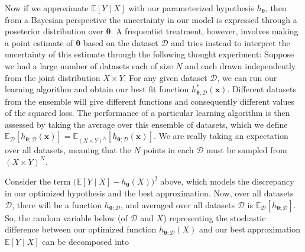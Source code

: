 \documentclass{article}
\begin{document}
      Now if we approximate $\mathbb{E}[Y \mid X]$ with our parameterized hypothesis $h_{\boldsymbol{\theta}}$, then from a Bayesian perspective the uncertainty in our model is expressed through a poseterior distribution over ${\boldsymbol{\theta}}$. A frequentist treatment, however, involves making a point estimate of ${\boldsymbol{\theta}}$ based on the dataset $\mathcal{D}$ and tries instead to interpret the uncertainty of this estimate through the following thought experiment: Suppose we had a large number of datasets each of size $N$ and each drawn independently from the joint distribution $X \times Y$. For any given dataset $\mathcal{D}$, we can run our learning algorithm and obtain our best fit function $h_{{\boldsymbol{\theta}}; \mathcal{D}}^\ast (\mathbf{x})$. Different datasets from the ensemble will give different functions and consequently different values of the squared loss. The performance of a particular learning algorithm is then assessed by taking the average over this ensemble of datasets, which we define $\mathbb{E}_\mathcal{D} [h_{{\boldsymbol{\theta}}; \mathcal{D}} (\mathbf{x})] = \mathbb{E}_{(X \times Y)^N} [h_{{\boldsymbol{\theta}}; \mathcal{D}} (\mathbf{x})]$. We are really taking an expectation over all datasets, meaning that the $N$ points in each $\mathcal{D}$ must be sampled from $(X \times Y)^N$. 

      Consider the term $\big(\mathbb{E}[Y \mid X] - h_{\boldsymbol{\theta}}(X) \big)^2$ above, which models the discrepancy in our optimized hypothesis and the best approximation. Now, over all datasets $\mathcal{D}$, there will be a function $h_{{\boldsymbol{\theta}}; \mathcal{D}}$, and averaged over all datasets $\mathcal{D}$ is $\mathbb{E}_\mathcal{D} [ h_{{\boldsymbol{\theta}}; \mathcal{D}}]$. So, the random variable below (of $\mathcal{D}$ and $X$) representing the stochastic difference between our optimized function $h_{{\boldsymbol{\theta}}; \mathcal{D}} (X)$ and our best approximation $\mathbb{E}[Y\mid X]$ can be decomposed into 
\end{document}
